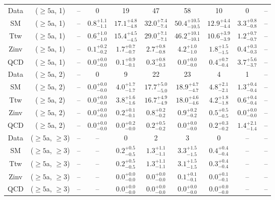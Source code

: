 \begin{table}[h!]
{\begin{tabular}{cccccccccc}
	Data & ($\ge5$a, 1) & -- & 0 & 19 & 47 & 58 & 10 & 0 & -- \\[0.5ex] 
	SM & ($\ge5$a, 1) & -- & $0.8^{+ 1.1 }_{- 1.1 }$ & $17.1^{+ 4.8 }_{- 4.8 }$ & $32.0^{+ 7.4 }_{- 7.4 }$ & $50.4^{+ 10.5 }_{- 10.5 }$ & $12.9^{+ 4.4 }_{- 4.4 }$ & $3.3^{+ 0.8 }_{- 0.8 }$ & -- \\[0.5ex] 
	Ttw & ($\ge5$a, 1) & -- & $0.6^{+ 1.0 }_{- 1.0 }$ & $15.4^{+ 4.5 }_{- 4.5 }$ & $29.0^{+ 7.1 }_{- 7.1 }$ & $46.2^{+ 10.1 }_{- 10.1 }$ & $10.6^{+ 3.9 }_{- 3.9 }$ & $1.2^{+ 0.7 }_{- 0.7 }$ & -- \\[0.5ex] 
	Zinv & ($\ge5$a, 1) & -- & $0.1^{+ 0.2 }_{- 0.2 }$ & $1.7^{+ 0.7 }_{- 0.7 }$ & $2.7^{+ 0.8 }_{- 0.8 }$ & $4.2^{+ 1.0 }_{- 1.0 }$ & $1.8^{+ 1.5 }_{- 1.5 }$ & $0.4^{+ 0.3 }_{- 0.3 }$ & -- \\[0.5ex] 
	QCD & ($\ge5$a, 1) & -- & $0.0^{+ 0.0 }_{- 0.0 }$ & $0.1^{+ 0.9 }_{- 0.1 }$ & $0.3^{+ 0.8 }_{- 0.3 }$ & $0.0^{+ 0.0 }_{- 0.0 }$ & $0.4^{+ 0.7 }_{- 0.4 }$ & $3.7^{+ 5.6 }_{- 3.7 }$ & -- \\[0.5ex] 
	Data & ($\ge5$a, 2) & -- & 0 & 9 & 22 & 23 & 4 & 1 & -- \\[0.5ex] 
	SM & ($\ge5$a, 2) & -- & $0.0^{+ 0.0 }_{- 0.0 }$ & $4.0^{+ 1.7 }_{- 1.7 }$ & $17.7^{+ 5.0 }_{- 5.0 }$ & $18.9^{+ 4.7 }_{- 4.7 }$ & $4.8^{+ 2.1 }_{- 2.1 }$ & $1.3^{+ 0.4 }_{- 0.4 }$ & -- \\[0.5ex] 
	Ttw & ($\ge5$a, 2) & -- & $0.0^{+ 0.0 }_{- 0.0 }$ & $3.8^{+ 1.6 }_{- 1.6 }$ & $16.7^{+ 4.9 }_{- 4.9 }$ & $18.0^{+ 4.6 }_{- 4.6 }$ & $4.2^{+ 1.8 }_{- 1.8 }$ & $0.6^{+ 0.4 }_{- 0.4 }$ & -- \\[0.5ex] 
	Zinv & ($\ge5$a, 2) & -- & $0.0^{+ 0.0 }_{- 0.0 }$ & $0.2^{+ 0.1 }_{- 0.1 }$ & $0.8^{+ 0.2 }_{- 0.2 }$ & $0.9^{+ 0.2 }_{- 0.2 }$ & $0.5^{+ 0.5 }_{- 0.5 }$ & $0.0^{+ 0.0 }_{- 0.0 }$ & -- \\[0.5ex] 
	QCD & ($\ge5$a, 2) & -- & $0.0^{+ 0.0 }_{- 0.0 }$ & $0.0^{+ 0.2 }_{- 0.0 }$ & $0.2^{+ 0.5 }_{- 0.2 }$ & $0.0^{+ 0.0 }_{- 0.0 }$ & $0.2^{+ 0.3 }_{- 0.2 }$ & $1.4^{+ 2.1 }_{- 1.4 }$ & -- \\[0.5ex] 
	Data & ($\ge5$a, $\ge3$) & -- & -- & 0 & 2 & 3 & 0 & -- & -- \\[0.5ex] 
	SM & ($\ge5$a, $\ge3$) & -- & -- & $0.2^{+ 0.5 }_{- 0.5 }$ & $1.3^{+ 1.1 }_{- 1.1 }$ & $3.3^{+ 1.5 }_{- 1.5 }$ & $0.4^{+ 0.4 }_{- 0.4 }$ & -- & -- \\[0.5ex] 
	Ttw & ($\ge5$a, $\ge3$) & -- & -- & $0.2^{+ 0.5 }_{- 0.5 }$ & $1.3^{+ 1.1 }_{- 1.1 }$ & $3.1^{+ 1.5 }_{- 1.5 }$ & $0.3^{+ 0.4 }_{- 0.4 }$ & -- & -- \\[0.5ex] 
	Zinv & ($\ge5$a, $\ge3$) & -- & -- & $0.0^{+ 0.0 }_{- 0.0 }$ & $0.0^{+ 0.0 }_{- 0.0 }$ & $0.1^{+ 0.1 }_{- 0.1 }$ & $0.0^{+ 0.1 }_{- 0.1 }$ & -- & -- \\[0.5ex] 
	QCD & ($\ge5$a, $\ge3$) & -- & -- & $0.0^{+ 0.0 }_{- 0.0 }$ & $0.0^{+ 0.0 }_{- 0.0 }$ & $0.0^{+ 0.0 }_{- 0.0 }$ & $0.0^{+ 0.0 }_{- 0.0 }$ & -- & -- \\[0.5ex] 
	\hline
	\hline
\end{tabular}}
\end{table}
